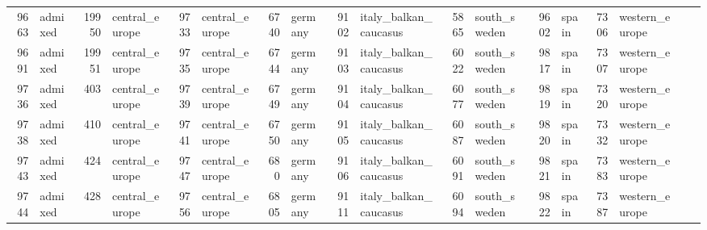 \begin{table}[h]
{\begin{tabular}{rl|rl|rl|rl|rl|rl|rl|rl|rl}
			9663                   & admixed         & 19950                  & central\_europe & 9733                   & central\_europe & 6740                   & germany         & 9102                   & italy\_balkan\_caucasus & 5865                   & south\_sweden           & 9602                   & spain           & 7306                   & western\_europe &                          &                 \\
			9691                   & admixed         & 19951                  & central\_europe & 9735                   & central\_europe & 6744                   & germany         & 9103                   & italy\_balkan\_caucasus & 6022                   & south\_sweden           & 9817                   & spain           & 7307                   & western\_europe &                          &                 \\
			9736                   & admixed         & 403                    & central\_europe & 9739                   & central\_europe & 6749                   & germany         & 9104                   & italy\_balkan\_caucasus & 6077                   & south\_sweden           & 9819                   & spain           & 7320                   & western\_europe &                          &                 \\
			9738                   & admixed         & 410                    & central\_europe & 9741                   & central\_europe & 6750                   & germany         & 9105                   & italy\_balkan\_caucasus & 6087                   & south\_sweden           & 9820                   & spain           & 7332                   & western\_europe &                          &                 \\
			9743                   & admixed         & 424                    & central\_europe & 9747                   & central\_europe & 680                    & germany         & 9106                   & italy\_balkan\_caucasus & 6091                   & south\_sweden           & 9821                   & spain           & 7383                   & western\_europe &                          &                 \\
			9744                   & admixed         & 428                    & central\_europe & 9756                   & central\_europe & 6805                   & germany         & 9111                   & italy\_balkan\_caucasus & 6094                   & south\_sweden           & 9822                   & spain           & 7387                   & western\_europe &                          &                 \\

\end{tabular}}
\end{table}
